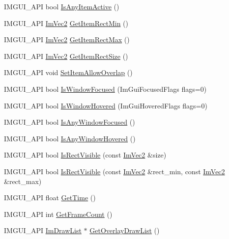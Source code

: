 \begin{DoxyCompactItemize}
\item 
I\+M\+G\+U\+I\+\_\+\+A\+PI bool \hyperlink{namespace_im_gui_acdc18199d50d26919312db5f9707b8dc}{Is\+Any\+Item\+Active} ()
\item 
I\+M\+G\+U\+I\+\_\+\+A\+PI \hyperlink{struct_im_vec2}{Im\+Vec2} \hyperlink{namespace_im_gui_a65b24b72ec0e8444c705cebf3e91f570}{Get\+Item\+Rect\+Min} ()
\item 
I\+M\+G\+U\+I\+\_\+\+A\+PI \hyperlink{struct_im_vec2}{Im\+Vec2} \hyperlink{namespace_im_gui_a3d260209b8dc25a2c942e8cfd1ed0e51}{Get\+Item\+Rect\+Max} ()
\item 
I\+M\+G\+U\+I\+\_\+\+A\+PI \hyperlink{struct_im_vec2}{Im\+Vec2} \hyperlink{namespace_im_gui_a3303d1c37041307e11fd46fc43b2274d}{Get\+Item\+Rect\+Size} ()
\item 
I\+M\+G\+U\+I\+\_\+\+A\+PI void \hyperlink{namespace_im_gui_a3291356b06ebe5f771d60b334a831d4b}{Set\+Item\+Allow\+Overlap} ()
\item 
I\+M\+G\+U\+I\+\_\+\+A\+PI bool \hyperlink{namespace_im_gui_a51ed119ab4be7fcf47a34644e262c87e}{Is\+Window\+Focused} (Im\+Gui\+Focused\+Flags flags=0)
\item 
I\+M\+G\+U\+I\+\_\+\+A\+PI bool \hyperlink{namespace_im_gui_aaed1ebf40cc2cb2ec30b0ba39b91d4a5}{Is\+Window\+Hovered} (Im\+Gui\+Hovered\+Flags flags=0)
\item 
I\+M\+G\+U\+I\+\_\+\+A\+PI bool \hyperlink{namespace_im_gui_ad45d4a6513c1275fccf1539fa3b2f109}{Is\+Any\+Window\+Focused} ()
\item 
I\+M\+G\+U\+I\+\_\+\+A\+PI bool \hyperlink{namespace_im_gui_a62379e94283e247288c9a6c15a2b797e}{Is\+Any\+Window\+Hovered} ()
\item 
I\+M\+G\+U\+I\+\_\+\+A\+PI bool \hyperlink{namespace_im_gui_a578ead6237b3ed05497ed361f18d9f97}{Is\+Rect\+Visible} (const \hyperlink{struct_im_vec2}{Im\+Vec2} \&size)
\item 
I\+M\+G\+U\+I\+\_\+\+A\+PI bool \hyperlink{namespace_im_gui_a5aca7e6939e07caaca489aa8c776fd81}{Is\+Rect\+Visible} (const \hyperlink{struct_im_vec2}{Im\+Vec2} \&rect\+\_\+min, const \hyperlink{struct_im_vec2}{Im\+Vec2} \&rect\+\_\+max)
\item 
I\+M\+G\+U\+I\+\_\+\+A\+PI float \hyperlink{namespace_im_gui_ab8d8a7a9e1a0e84e636202ec74733db9}{Get\+Time} ()
\item 
I\+M\+G\+U\+I\+\_\+\+A\+PI int \hyperlink{namespace_im_gui_a0180211f23fc10807dfc3d2f6e8681f9}{Get\+Frame\+Count} ()
\item 
I\+M\+G\+U\+I\+\_\+\+A\+PI \hyperlink{struct_im_draw_list}{Im\+Draw\+List} $\ast$ \hyperlink{namespace_im_gui_aa992d915c56bb56a87737964352614ae}{Get\+Overlay\+Draw\+List} ()

\end{DoxyCompactItemize}
